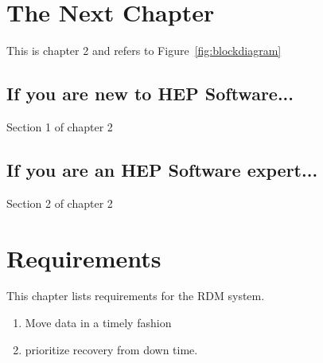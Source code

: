 \chapter{The Next Chapter}
\label{ch:next_chapter}

This is chapter 2 and refers to Figure~\ref{fig:blockdiagram}



\section{If you are new to HEP Software...}

Section 1 of chapter 2


\section{If you are an HEP Software expert...}

Section 2 of chapter 2



\chapter{Requirements}

This chapter lists requirements for the RDM system.

\begin{enumerate}
  \item Move data in a timely fashion
  \item prioritize recovery from down time.
\end{enumerate}

